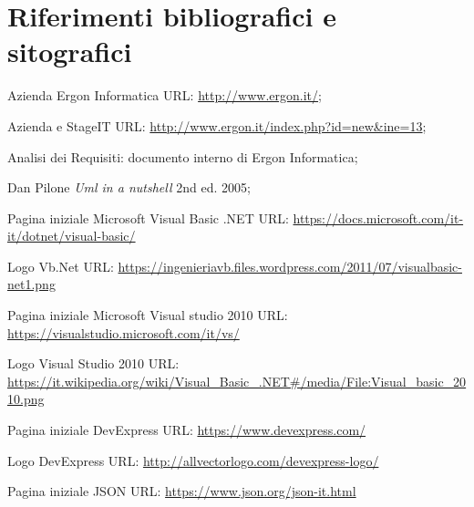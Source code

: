 

\chapter{Riferimenti bibliografici e sitografici}

\begin{enumerate}[label={[\arabic*]}]
    \item \label{sec:ergon} Azienda Ergon Informatica URL: \url{http://www.ergon.it/};
    
    \item \label{sec:ergon2} Azienda e StageIT URL: \url{http://www.ergon.it/index.php?id=new&ine=13};
    
    \item \label{analisi-requisiti} Analisi dei Requisiti: documento interno di Ergon Informatica;
    
    \item \label{uml} Dan Pilone \textit{Uml in a nutshell} 2nd ed. 2005;
    
    \item \label{vbnet} Pagina iniziale Microsoft Visual Basic .NET URL: \url{https://docs.microsoft.com/it-it/dotnet/visual-basic/}
    
    \item \label{vb-logo} Logo Vb.Net URL: \url{https://ingenieriavb.files.wordpress.com/2011/07/visualbasic-net1.png}
    
    \item \label{vs} Pagina iniziale Microsoft Visual studio 2010 URL: \url{https://visualstudio.microsoft.com/it/vs/}

    \item \label{vs-logo} Logo Visual Studio 2010 URL: \url{https://it.wikipedia.org/wiki/Visual_Basic_.NET#/media/File:Visual_basic_2010.png}
    
    \item \label{devexpress} Pagina iniziale DevExpress URL: \url{https://www.devexpress.com/}
    
    \item \label{devlogo} Logo DevExpress URL: \url{http://allvectorlogo.com/devexpress-logo/}
    
    \item \label{json} Pagina iniziale JSON URL: \url{https://www.json.org/json-it.html}
    

\end{enumerate}
